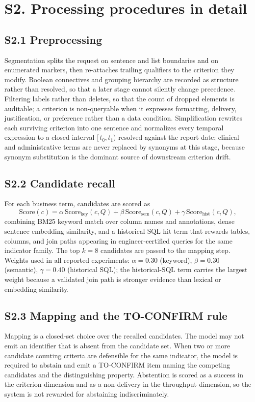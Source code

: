 \documentclass[10pt]{article}
\begin{document}
\section{S2. Processing procedures in detail}

\subsection{S2.1 Preprocessing}
Segmentation splits the request on sentence and list boundaries and on
enumerated markers, then re-attaches trailing qualifiers to the criterion they
modify. Boolean connectives and grouping hierarchy are recorded as structure
rather than resolved, so that a later stage cannot silently change precedence.
Filtering labels rather than deletes, so that the count of dropped elements is
auditable; a criterion is non-queryable when it expresses formatting, delivery,
justification, or preference rather than a data condition. Simplification
rewrites each surviving criterion into one sentence and normalizes every
temporal expression to a closed interval $[\,t_{0},t_{1})$ resolved against the
report date; clinical and administrative terms are never replaced by synonyms at
this stage, because synonym substitution is the dominant source of downstream
criterion drift.

\subsection{S2.2 Candidate recall}
For each business term, candidates are scored as
\[
\text{Score}(c)=\alpha\,\text{Score}_{\text{key}}(c,Q)
+\beta\,\text{Score}_{\text{sem}}(c,Q)
+\gamma\,\text{Score}_{\text{hist}}(c,Q),
\]
combining BM25 keyword match over column names and annotations, dense
sentence-embedding similarity, and a historical-SQL hit term that rewards
tables, columns, and join paths appearing in engineer-certified queries for the
same indicator family. The top $k=8$ candidates are passed to the mapping step.
Weights used in all reported experiments: $\alpha=0.30$ (keyword), $\beta=0.30$ (semantic), $\gamma=0.40$ (historical SQL); the historical-SQL term
carries the largest weight because a validated join path is stronger evidence
than lexical or embedding similarity.

\subsection{S2.3 Mapping and the TO-CONFIRM rule}
Mapping is a closed-set choice over the recalled candidates. The model may not
emit an identifier that is absent from the candidate set. When two or more
candidate counting criteria are defensible for the same indicator, the model is
required to abstain and emit a TO-CONFIRM item naming the competing candidates
and the distinguishing property. Abstention is scored as a success in the
criterion dimension and as a non-delivery in the throughput dimension, so the
system is not rewarded for abstaining indiscriminately.
\end{document}
